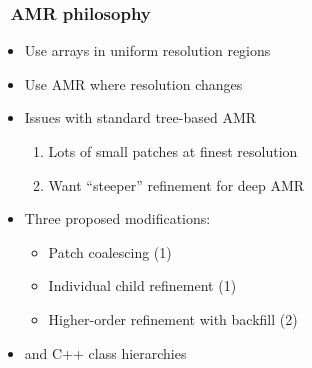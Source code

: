 \begin{frame}[fragile] \frametitle{\cello\ AMR philosophy}
\begin{itemize}
\item Use arrays in uniform resolution regions
\item Use AMR where resolution changes
\item Issues with standard tree-based AMR
\begin{enumerate}
\item Lots of small patches at finest resolution
\item Want ``steeper'' refinement for deep AMR
\end{enumerate}
\item Three proposed modifications:
\begin{itemize}
\item Patch coalescing (1)
\item Individual child refinement (1)
\item Higher-order refinement with backfill (2)
\end{itemize}
\item {} and  C++ class hierarchies
\end{itemize}
\end{frame}


